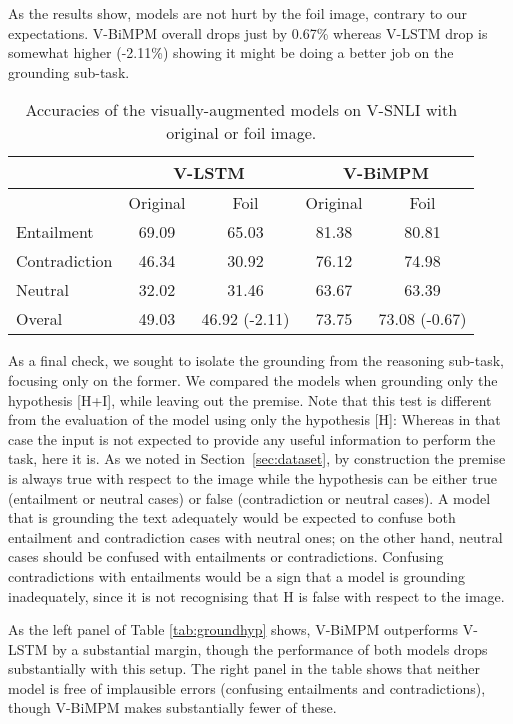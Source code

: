 \documentclass[11pt]{article}
\begin{document}
As the results show, models are not hurt by the foil image, contrary to our expectations. 
V-BiMPM overall drops just by 0.67\% whereas V-LSTM
drop is somewhat higher (-2.11\%) showing it might be doing a better
job on the grounding sub-task.

 \begin{table}
\small
\begin{center}
\begin{tabular}{|l|cc|cc|}
\hline
& \multicolumn{2}{|c|}{V-LSTM} & \multicolumn{2}{c|}{V-BiMPM}\\ \hline
 & Original & Foil & Original & Foil  \\\hline
Entailment & 69.09& 65.03  & 81.38  & 80.81    \\
Contradiction & 46.34 & 30.92 &76.12 & 74.98  \\
Neutral & 32.02 & 31.46  & 63.67 & 63.39  \\
\hline
Overal & 49.03 &  46.92 (-2.11) & 73.75 & 73.08  (-0.67) \\
\hline
\end{tabular}
\caption{Accuracies of the visually-augmented models on
  V-SNLI with original or foil image.}\label{tab:wrongimages}
\end{center}
\end{table}

As a final check, we sought to isolate the grounding from the reasoning sub-task, focusing only on the former.
We compared the models
when grounding only the hypothesis [H+I], while leaving out the premise. Note that this test is
different from the evaluation of the model using only the hypothesis
[H]: Whereas in that case the input is not expected to provide any
useful information to perform the task, here it is. As we noted in
Section~\ref{sec:dataset}, by construction the premise is always true
with respect to the image while the hypothesis can be either true
(entailment or neutral cases) or false (contradiction or neutral
cases). A model that is grounding the text adequately would be expected to
confuse both entailment and contradiction cases with neutral ones; on the other hand, neutral cases
should be confused with entailments or contradictions. Confusing contradictions with entailments would be a sign that a
model is grounding inadequately, since it is not recognising that H is false with respect to the image.

As the left panel of Table \ref{tab:groundhyp} shows, V-BiMPM outperforms V-LSTM by a substantial margin, though the performance of both models drops substantially with this setup. The right panel in the table shows that neither model is free of implausible errors (confusing entailments and contradictions), though V-BiMPM makes substantially fewer of these. 
\end{document}
